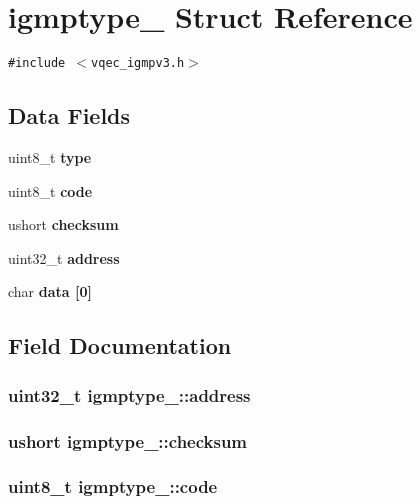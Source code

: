 \section{igmptype\_\- Struct Reference}
\label{structigmptype__}
{\tt \#include $<$vqec\_\-igmpv3.h$>$}

\subsection*{Data Fields}
\begin{CompactItemize}
\item 
uint8\_\-t \bf{type}
\item 
uint8\_\-t \bf{code}
\item 
ushort \bf{checksum}
\item 
uint32\_\-t \bf{address}
\item 
char \bf{data} [0]
\end{CompactItemize}


\subsection{Field Documentation}
\subsubsection{\setlength{\rightskip}{0pt plus 5cm}uint32\_\-t \bf{igmptype\_\-::address}}\label{structigmptype___0c36fe4fb9ad6b8b8dc76d5c7c1efee3}


\subsubsection{\setlength{\rightskip}{0pt plus 5cm}ushort \bf{igmptype\_\-::checksum}}\label{structigmptype___80499881ec48b4e2558b63ad66ec6425}


\subsubsection{\setlength{\rightskip}{0pt plus 5cm}uint8\_\-t \bf{igmptype\_\-::code}}\label{structigmptype___0cfb2ff4d5c368f026b9a0a2a3da189b}


